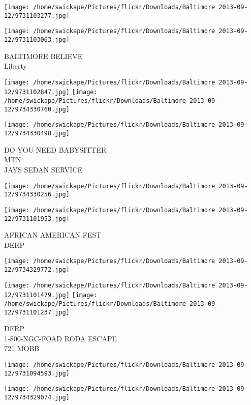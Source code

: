\documentclass[10pt,letterpaper]{article}
\begin{document}
\texttt{[image: /home/swickape/Pictures/flickr/Downloads/Baltimore 2013-09-12/9731103277.jpg]}

\vspace{0.25in}
\texttt{[image: /home/swickape/Pictures/flickr/Downloads/Baltimore 2013-09-12/9731103063.jpg]}

BALTIMORE BELIEVE\\
Liberty
\pagebreak

\texttt{[image: /home/swickape/Pictures/flickr/Downloads/Baltimore 2013-09-12/9731102847.jpg]}
\texttt{[image: /home/swickape/Pictures/flickr/Downloads/Baltimore 2013-09-12/9734330760.jpg]}

\vspace{0.25in}
\texttt{[image: /home/swickape/Pictures/flickr/Downloads/Baltimore 2013-09-12/9734330498.jpg]}

DO YOU NEED BABYSITTER\\
MTN\\
JAYS SEDAN SERVICE
\pagebreak

\texttt{[image: /home/swickape/Pictures/flickr/Downloads/Baltimore 2013-09-12/9734330256.jpg]}

\vspace{0.25in}
\texttt{[image: /home/swickape/Pictures/flickr/Downloads/Baltimore 2013-09-12/9731101953.jpg]}

AFRICAN AMERICAN FEST\\
DERP
\pagebreak

\texttt{[image: /home/swickape/Pictures/flickr/Downloads/Baltimore 2013-09-12/9734329772.jpg]}

\vspace{0.25in}
\texttt{[image: /home/swickape/Pictures/flickr/Downloads/Baltimore 2013-09-12/9731101479.jpg]}
\texttt{[image: /home/swickape/Pictures/flickr/Downloads/Baltimore 2013-09-12/9731101237.jpg]}

DERP\\
1{-}800{-}NGC{-}FOAD RODA ESCAPE\\
721 MOBB
\pagebreak

\texttt{[image: /home/swickape/Pictures/flickr/Downloads/Baltimore 2013-09-12/9731094593.jpg]}

\vspace{0.25in}
\texttt{[image: /home/swickape/Pictures/flickr/Downloads/Baltimore 2013-09-12/9734329074.jpg]}
\end{document}

